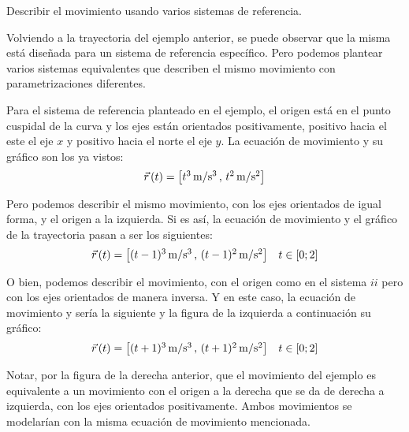 \begin{mdframed}[style=ExampleFrame]
    \begin{example}
    \end{example}
    \begin{formatI}
        Describir el movimiento usando varios sistemas de referencia.
    \end{formatI}
    Volviendo a la trayectoria del ejemplo anterior, se puede observar que la misma está diseñada para un sistema de referencia específico.
    Pero podemos plantear varios sistemas equivalentes que describen el mismo movimiento con parametrizaciones diferentes.
    
    Para el sistema de referencia planteado en el ejemplo, el origen está en el punto cuspidal de la curva y los ejes están orientados positivamente, positivo hacia el este el eje $x$ y positivo hacia el norte el eje $y$.
    La ecuación de movimiento y su gráfico son los ya vistos:
    \begin{equation*}
        \vec{r}\hspace{0.05cm}(t) = { \begin{bmatrix} t^3 \, \si{\metre\per\second^3} \, , \, t^2 \, \si{\metre\per\second^2} \end{bmatrix} }
    \end{equation*}
    
    \begin{center}
        \def\svgwidth{\linewidth}
        
    \end{center}
    
    Pero podemos describir el mismo movimiento, con los ejes orientados de igual forma, y el origen a la izquierda.
    Si es así, la ecuación de movimiento y el gráfico de la trayectoria pasan a ser los siguientes:
    \[ \vec{r}\hspace{0.05cm}(t) = { \begin{bmatrix} (t-1)^3 \, \si{\metre\per\second^3} \, , \, (t-1)^2 \, \si{\metre\per\second^2} \end{bmatrix} } \quad t \in [0;2] \]
    
    \begin{center}
        \def\svgwidth{\linewidth}
        
    \end{center}
    
    O bien, podemos describir el movimiento, con el origen como en el sistema $ii$ pero con los ejes orientados de manera inversa.
    Y en este caso, la ecuación de movimiento y sería la siguiente y la figura de la izquierda a continuación su gráfico:
    \[ \vec{r}\hspace{0.05cm}(t)= { \begin{bmatrix} (t+1)^3 \, \si{\metre\per\second^3} \, , \, (t+1)^2 \, \si{\metre\per\second^2} \end{bmatrix} } \quad t \in [0;2] \]
    
    \begin{center}
        \def\svgwidth{\linewidth}
        
    \end{center}
    
    Notar, por la figura de la derecha anterior, que el movimiento del ejemplo es equivalente a un movimiento con el origen a la derecha que se da de derecha a izquierda, con los ejes orientados positivamente.
    Ambos movimientos se modelarían con la misma ecuación de movimiento mencionada.
\end{mdframed}